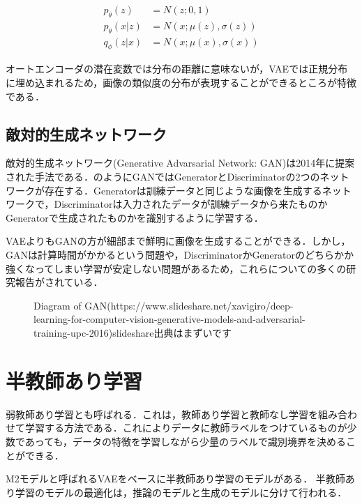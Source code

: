 \begin{align}\label{eq:vae}
p_\theta (z) & = N (z; 0, 1)  \\
p_\theta (x|z) & = N (x; \mu(z), \sigma(z)) \\
q_\phi (z|x) & = N (x; \mu(x), \sigma(x))
\end{align}

オートエンコーダの潜在変数では分布の距離に意味ないが，VAEでは正規分布に埋め込まれるため，画像の類似度の分布が表現することができるところが特徴である\cite{abbasnejad2017infinite}．

\subsection{敵対的生成ネットワーク}
敵対的生成ネットワーク(Generative Advarsarial Network: GAN)は2014年に提案された手法である\cite{GAN}．のようにGANではGeneratorとDiscriminatorの2つのネットワークが存在する．Generatorは訓練データと同じような画像を生成するネットワークで，Discriminatorは入力されたデータが訓練データから来たものかGeneratorで生成されたものかを識別するように学習する．

VAEよりもGANの方が細部まで鮮明に画像を生成することができる．しかし，GANは計算時間がかかるという問題や，DiscriminatorかGeneratorのどちらかか強くなってしまい学習が安定しない問題があるため，これらについての多くの研究報告がされている．

\begin{figure}[H]
	\centering
	\caption{Diagram of GAN(https://www.slideshare.net/xavigiro/deep-learning-for-computer-vision-generative-models-and-adversarial-training-upc-2016)slideshare出典はまずいです}
	\label{fig:GAN}
\end{figure}

\section{半教師あり学習}
弱教師あり学習とも呼ばれる．これは，教師あり学習と教師なし学習を組み合わせて学習する方法である．これによりデータに教師ラベルをつけているものが少数であっても，データの特徴を学習しながら少量のラベルで識別境界を決めることができる．

M2モデルと呼ばれるVAEをベースに半教師あり学習のモデルがある\cite{M2model}．
半教師あり学習のモデルの最適化は，推論のモデルと生成のモデルに分けて行われる\cite{narayanaswamy2017learning}．

